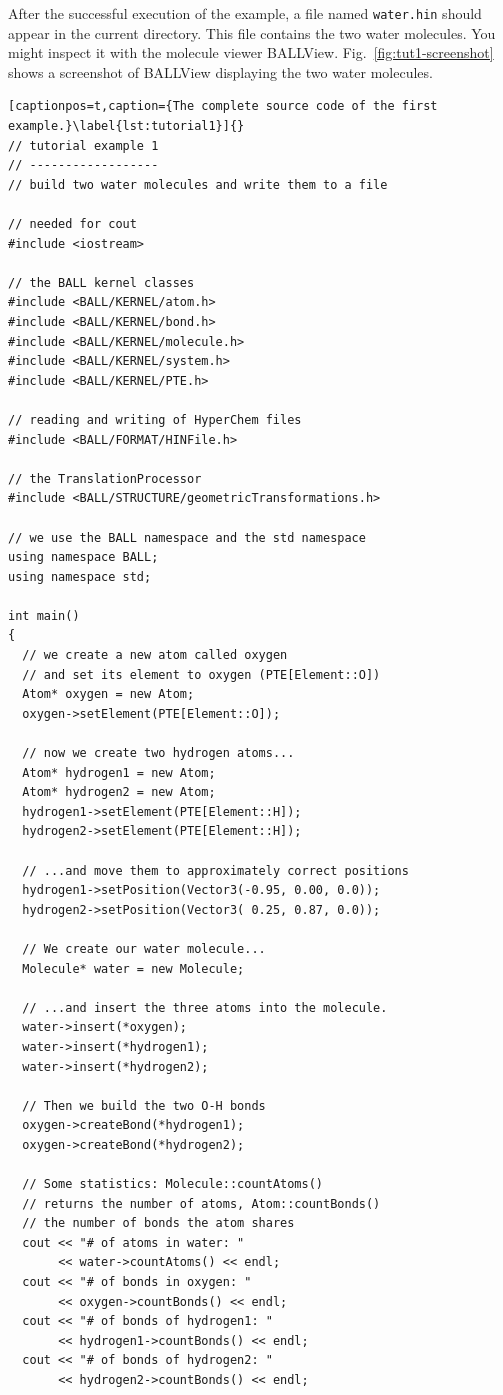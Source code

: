 After the successful execution of the example, a file named {\tt water.hin}
should appear in the current directory. This file contains the two water
molecules. You might inspect it with the molecule viewer BALLView.
Fig.~\ref{fig:tut1-screenshot} shows a screenshot of BALLView displaying the two
water molecules.

\newpage
\begin{lstlisting}[captionpos=t,caption={The complete source code of the first example.}\label{lst:tutorial1}]{}
// tutorial example 1
// ------------------
// build two water molecules and write them to a file

// needed for cout
#include <iostream>

// the BALL kernel classes
#include <BALL/KERNEL/atom.h>
#include <BALL/KERNEL/bond.h>
#include <BALL/KERNEL/molecule.h>
#include <BALL/KERNEL/system.h>
#include <BALL/KERNEL/PTE.h>

// reading and writing of HyperChem files
#include <BALL/FORMAT/HINFile.h>

// the TranslationProcessor
#include <BALL/STRUCTURE/geometricTransformations.h>

// we use the BALL namespace and the std namespace
using namespace BALL;
using namespace std;

int main()
{
  // we create a new atom called oxygen
  // and set its element to oxygen (PTE[Element::O])
  Atom* oxygen = new Atom;
  oxygen->setElement(PTE[Element::O]);

  // now we create two hydrogen atoms...
  Atom* hydrogen1 = new Atom;
  Atom* hydrogen2 = new Atom;
  hydrogen1->setElement(PTE[Element::H]);
  hydrogen2->setElement(PTE[Element::H]);

  // ...and move them to approximately correct positions
  hydrogen1->setPosition(Vector3(-0.95, 0.00, 0.0));
  hydrogen2->setPosition(Vector3( 0.25, 0.87, 0.0));

  // We create our water molecule...
  Molecule* water = new Molecule;

  // ...and insert the three atoms into the molecule.
  water->insert(*oxygen);
  water->insert(*hydrogen1);
  water->insert(*hydrogen2);

  // Then we build the two O-H bonds
  oxygen->createBond(*hydrogen1);
  oxygen->createBond(*hydrogen2);

  // Some statistics: Molecule::countAtoms() 
  // returns the number of atoms, Atom::countBonds() 
  // the number of bonds the atom shares
  cout << "# of atoms in water: " 
       << water->countAtoms() << endl;
  cout << "# of bonds in oxygen: " 
       << oxygen->countBonds() << endl;
  cout << "# of bonds of hydrogen1: " 
       << hydrogen1->countBonds() << endl;
  cout << "# of bonds of hydrogen2: " 
       << hydrogen2->countBonds() << endl;


\end{lstlisting}
